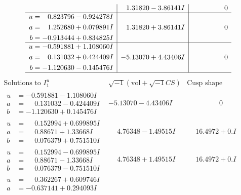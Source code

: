 \documentclass[1p]{elsarticle_modified}
\theoremstyle{definition}
\newcommand{\I}{\sqrt{-1}}
\begin{document}
$$\begin{array}{c|c|c}
 & \phantom{-}1.31820 - 3.86141 I & \phantom{-0.000000 } 0 \\ \hline\begin{aligned}
u &= \phantom{-}0.823796 - 0.924278 I \\
a &= \phantom{-}1.252680 + 0.079891 I \\
b &= -0.913444 + 0.834825 I\end{aligned}
 & \phantom{-}1.31820 + 3.86141 I & \phantom{-0.000000 } 0 \\ \hline\begin{aligned}
u &= -0.591881 + 1.108060 I \\
a &= \phantom{-}0.131032 + 0.424409 I \\
b &= -1.120630 - 0.145476 I\end{aligned}
 & -5.13070 + 4.43406 I & \phantom{-0.000000 } 0\\
 \hline 
 \end{array}$$\newpage$$\begin{array}{c|c|c}  
\text{Solutions to }I^u_{1}& \I (\text{vol} + \sqrt{-1}CS) & \text{Cusp shape}\\
 \hline 
\begin{aligned}
u &= -0.591881 - 1.108060 I \\
a &= \phantom{-}0.131032 - 0.424409 I \\
b &= -1.120630 + 0.145476 I\end{aligned}
 & -5.13070 - 4.43406 I & \phantom{-0.000000 } 0 \\ \hline\begin{aligned}
u &= \phantom{-}0.152994 + 0.699895 I \\
a &= \phantom{-}0.88671 + 1.33668 I \\
b &= \phantom{-}0.076379 + 0.751510 I\end{aligned}
 & \phantom{-}4.76348 - 1.49515 I & \phantom{-}16.4972 + 0. I\phantom{ +0.000000I} \\ \hline\begin{aligned}
u &= \phantom{-}0.152994 - 0.699895 I \\
a &= \phantom{-}0.88671 - 1.33668 I \\
b &= \phantom{-}0.076379 - 0.751510 I\end{aligned}
 & \phantom{-}4.76348 + 1.49515 I & \phantom{-}16.4972 + 0. I\phantom{ +0.000000I} \\ \hline\begin{aligned}
u &= \phantom{-}0.362267 + 0.609746 I \\
a &= -0.637141 + 0.294093 I \\

\end{aligned}
\end{array}$$
\end{document}

